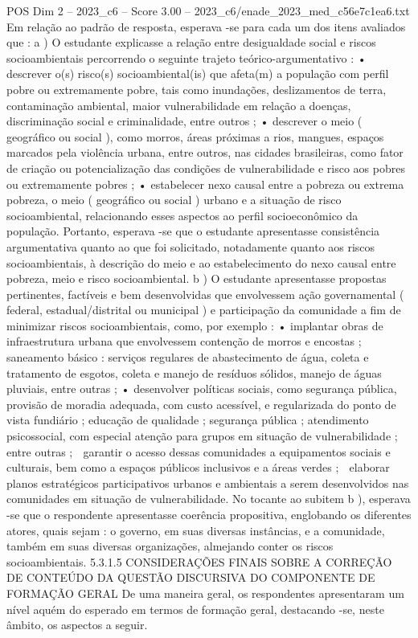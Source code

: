 \begin{textsample}{POS Dim 2 – 2023\_c6 – Score 3.00 – 2023\_c6/enade\_2023\_med\_c56e7c1ea6.txt}
Em relação ao padrão de resposta, esperava -se para cada um dos itens avaliados que : a ) O estudante explicasse a relação entre desigualdade social e riscos socioambientais percorrendo o seguinte trajeto teórico-argumentativo : • descrever o(s) risco(s) socioambiental(is) que afeta(m) a população com perfil pobre ou extremamente pobre, tais como inundações, deslizamentos de terra, contaminação ambiental, maior vulnerabilidade em relação a doenças, discriminação social e criminalidade, entre outros ; • descrever o meio ( geográfico ou social ), como morros, áreas próximas a rios, mangues, espaços marcados pela violência urbana, entre outros, nas cidades brasileiras, como fator de criação ou potencialização das condições de vulnerabilidade e risco aos pobres ou extremamente pobres ; • estabelecer nexo causal entre a pobreza ou extrema pobreza, o meio ( geográfico ou social ) urbano e a situação de risco socioambiental, relacionando esses aspectos ao perfil socioeconômico da população.
Portanto, esperava -se que o estudante apresentasse consistência argumentativa quanto ao que foi solicitado, notadamente quanto aos riscos socioambientais, à descrição do meio e ao estabelecimento do nexo causal entre pobreza, meio e risco socioambiental. b ) O estudante apresentasse propostas pertinentes, factíveis e bem desenvolvidas que envolvessem ação governamental ( federal, estadual/distrital ou municipal ) e participação da comunidade a fim de minimizar riscos socioambientais, como, por exemplo : • implantar obras de infraestrutura urbana que envolvessem contenção de morros e encostas ; saneamento básico : serviços regulares de abastecimento de água, coleta e tratamento de esgotos, coleta e manejo de resíduos sólidos, manejo de águas pluviais, entre outras ; • desenvolver políticas sociais, como segurança pública, provisão de moradia adequada, com custo acessível, e regularizada do ponto de vista fundiário ; educação de qualidade ; segurança pública ; atendimento psicossocial, com especial atenção para grupos em situação de vulnerabilidade ; entre outras ;  garantir o acesso dessas comunidades a equipamentos sociais e culturais, bem como a espaços públicos inclusivos e a áreas verdes ;  elaborar planos estratégicos participativos urbanos e ambientais a serem desenvolvidos nas comunidades em situação de vulnerabilidade.
No tocante ao subitem b ), esperava -se que o respondente apresentasse coerência propositiva, englobando os diferentes atores, quais sejam : o governo, em suas diversas instâncias, e a comunidade, também em suas diversas organizações, almejando conter os riscos socioambientais. 5.3.1.5 CONSIDERAÇÕES FINAIS SOBRE A CORREÇÃO DE CONTEÚDO DA QUESTÃO DISCURSIVA DO COMPONENTE DE FORMAÇÃO GERAL De uma maneira geral, os respondentes apresentaram um nível aquém do esperado em termos de formação geral, destacando -se, neste âmbito, os aspectos a seguir.

\end{textsample}
